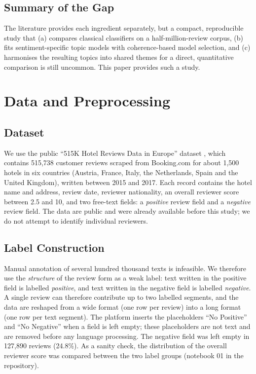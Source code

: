 \documentclass[11pt,journal,draftclsnofoot,onecolumn]{IEEEtran}
\begin{document}
\subsection{Summary of the Gap}
The literature provides each ingredient separately, but a compact, reproducible study that (a) compares classical classifiers on a half-million-review corpus, (b) fits sentiment-specific topic models with coherence-based model selection, and (c) harmonises the resulting topics into shared themes for a direct, quantitative comparison is still uncommon. This paper provides such a study.

\section{Data and Preprocessing}
\subsection{Dataset}
We use the public ``515K Hotel Reviews Data in Europe'' dataset \cite{liu2018dataset}, which contains 515,738 customer reviews scraped from Booking.com for about 1,500 hotels in six countries (Austria, France, Italy, the Netherlands, Spain and the United Kingdom), written between 2015 and 2017. Each record contains the hotel name and address, review date, reviewer nationality, an overall reviewer score between 2.5 and 10, and two free-text fields: a \emph{positive} review field and a \emph{negative} review field. The data are public and were already available before this study; we do not attempt to identify individual reviewers.

\subsection{Label Construction}
Manual annotation of several hundred thousand texts is infeasible. We therefore use the \emph{structure} of the review form as a weak label: text written in the positive field is labelled \emph{positive}, and text written in the negative field is labelled \emph{negative}. A single review can therefore contribute up to two labelled segments, and the data are reshaped from a wide format (one row per review) into a long format (one row per text segment). The platform inserts the placeholders ``No Positive'' and ``No Negative'' when a field is left empty; these placeholders are not text and are removed before any language processing. The negative field was left empty in 127,890 reviews (24.8\%). As a sanity check, the distribution of the overall reviewer score was compared between the two label groups (notebook 01 in the repository).
\end{document}
